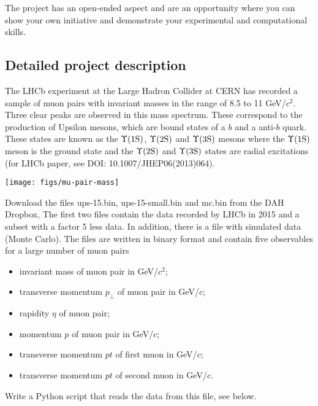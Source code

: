 The project has an open-ended aspect and are an opportunity where you can show your own initiative and demonstrate your experimental and computational skills. 

\subsection{Detailed project description}

The LHCb experiment at the Large Hadron Collider at CERN has recorded a sample of muon pairs with invariant masses in the range of 8.5 to 11 GeV/$c^2$. Three clear peaks are observed in this mass spectrum. These correspond to the production of Upsilon mesons, which are bound states of a $b$ and a anti-$b$ quark. These states are known as the $\Upsilon \rm (1S)$, $\Upsilon \rm (2S)$ and $\Upsilon \rm (3S)$ mesons where the $\Upsilon \rm (1S)$ meson is the ground state and the $\Upsilon \rm (2S)$  and $\Upsilon \rm (3S)$  states are radial excitations (for LHCb paper, see {DOI: 10.1007/JHEP06(2013)064).}

\begin{center}
    \texttt{[image: figs/mu-pair-mass]}
\end{center}

Download the files ups-15.bin, ups-15-small.bin and mc.bin   from the DAH Dropbox, 
The first  two files contain the data recorded by LHCb in 2015 and a subset with a factor 5 less data. 
In addition, there is a file with simulated data (Monte Carlo).
The files are written in binary format and contain five observables for a large number of muon pairs
\begin{itemize}
\item  invariant mass of muon pair in   GeV/$c^2$;
\item transverse momentum $p_\perp$ of muon pair in GeV/$c$;
\item rapidity $\eta$ of muon pair;
\item  momentum $p$ of muon pair in GeV/$c$;
\item transverse momentum $pt$ of first muon in GeV/$c$;
\item transverse momentum $pt$ of second muon in GeV/$c$.
\end{itemize}

Write a Python script that reads the data from this file, see below. 


\vspace*{-0.5cm}

